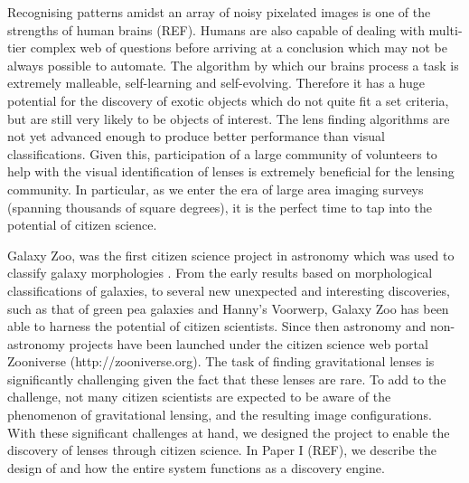 \documentclass[useAMS,usenatbib,a4paper]{mn2e}
\begin{document}
Recognising patterns amidst an array of noisy pixelated images is one of the
strengths of human brains (REF). Humans are also capable of dealing with
multi-tier complex web of questions before arriving at a conclusion which may
not be always possible to automate. The algorithm by which our brains process a
task is extremely malleable, self-learning and self-evolving. Therefore it has
a huge potential for the discovery of exotic objects which do not quite fit a
set criteria, but are still very likely to be objects of interest. The lens
finding algorithms are not yet advanced enough to produce better performance
than visual classifications. Given this, participation of a large community of
volunteers to help with the visual identification of lenses is extremely
beneficial for the lensing community. In particular, as we enter the era of
large area imaging surveys (spanning thousands of square degrees), it is
the perfect time to tap into the potential of citizen science.

Galaxy Zoo, was the first citizen science project in astronomy which was used to
classify galaxy morphologies \citep{Lintott2008}.  From the early results based
on morphological classifications of galaxies, to several new unexpected and
interesting discoveries, such as that of green pea galaxies and Hanny's
Voorwerp, Galaxy Zoo has been able to harness the potential of citizen
scientists.  Since then astronomy and non-astronomy projects have been launched
under the citizen science web portal Zooniverse (http://zooniverse.org). The task of finding
gravitational lenses is significantly challenging given the fact that these
lenses are rare. To add to the challenge, not many citizen scientists are
expected to be aware of the phenomenon of gravitational lensing, and the
resulting image configurations.  With these significant challenges at hand, we
designed the \sw project to enable the discovery of lenses through citizen
science.  In Paper I (REF), we describe the design of \sw and how the entire
system functions as a discovery engine.
\end{document}

